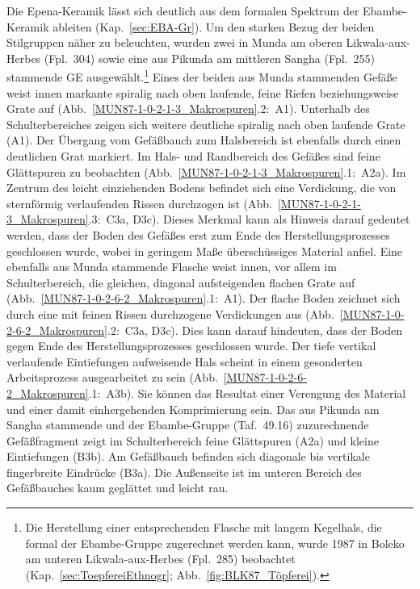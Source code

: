 Die Epena-Keramik lässt sich deutlich aus dem formalen Spektrum der Ebambe-Keramik ableiten (Kap.~\ref{sec:EBA-Gr}). Um den starken Bezug der beiden Stilgruppen näher zu beleuchten, wurden zwei in Munda am oberen Likwala-aux-Herbes (Fpl.~304) sowie eine aus Pikunda am mittleren Sangha (Fpl.~255) stammende GE ausgewählt.\footnote{Die Herstellung einer entsprechenden Flasche mit langem Kegelhals, die formal der Ebambe-Gruppe zugerechnet werden kann, wurde 1987 in Boleko am unteren Likwala-aux-Herbes (Fpl.~285) beobachtet (Kap.~\ref{sec:ToepfereiEthnogr}; Abb.~\ref{fig:BLK87_Töpferei}).} Eines der beiden aus Munda stammenden Gefäße weist innen markante spiralig nach oben laufende, feine Riefen beziehungsweise Grate auf (Abb.~\ref{MUN87-1-0-2-1-3_Makrospuren}.2:~A1). Unterhalb des Schulterbereiches zeigen sich weitere deutliche spiralig nach oben laufende Grate (A1). Der Übergang vom Gefäßbauch zum Halsbereich ist ebenfalls durch einen deutlichen Grat markiert. Im Hals- und Randbereich des Gefäßes sind feine Glättspuren zu beobachten (Abb.~\ref{MUN87-1-0-2-1-3_Makrospuren}.1:~A2a). Im Zentrum des leicht einziehenden Bodens befindet sich eine Verdickung, die von sternförmig verlaufenden Rissen durchzogen ist (Abb.~\ref{MUN87-1-0-2-1-3_Makrospuren}.3:~C3a, D3c). Dieses Merkmal kann als Hinweis darauf gedeutet werden, dass der Boden des Gefäßes erst zum Ende des Herstellungsprozesses geschlossen wurde, wobei in geringem Maße überschüssiges Material anfiel. Eine ebenfalls aus Munda stammende Flasche weist innen, vor allem im Schulterbereich, die gleichen, diagonal aufsteigenden flachen Grate auf (Abb.~\ref{MUN87-1-0-2-6-2_Makrospuren}.1:~A1). Der flache Boden zeichnet sich durch eine mit feinen Rissen durchzogene Verdickungen aus (Abb.~\ref{MUN87-1-0-2-6-2_Makrospuren}.2:~C3a, D3c). Dies kann darauf hindeuten, dass der Boden gegen Ende des Herstellungsprozesses geschlossen wurde. Der tiefe vertikal verlaufende Eintiefungen aufweisende Hals scheint in einem gesonderten Arbeitsprozess ausgearbeitet zu sein (Abb.~\ref{MUN87-1-0-2-6-2_Makrospuren}.1:~A3b). Sie können das Resultat einer Verengung des Material und einer damit einhergehenden Komprimierung sein. Das aus Pikunda am Sangha stammende und der Ebambe-Gruppe (Taf.~49.16) zuzurechnende Gefäßfragment zeigt im Schulterbereich feine Glättspuren (A2a) und kleine Eintiefungen (B3b). Am Gefäßbauch befinden sich diagonale bis vertikale fingerbreite Eindrücke (B3a). Die Außenseite ist im unteren Bereich des Gefäßbauches kaum geglättet und leicht rau.

